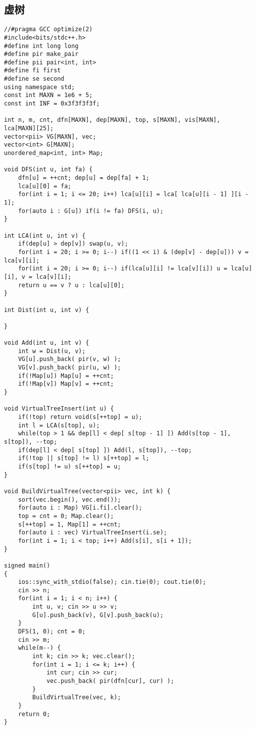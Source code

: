 \subsection{虚树}
\begin{lstlisting}
//#pragma GCC optimize(2)
#include<bits/stdc++.h>
#define int long long
#define pir make_pair
#define pii pair<int, int>
#define fi first
#define se second
using namespace std;
const int MAXN = 1e6 + 5;
const int INF = 0x3f3f3f3f;

int n, m, cnt, dfn[MAXN], dep[MAXN], top, s[MAXN], vis[MAXN], lca[MAXN][25];
vector<pii> VG[MAXN], vec;
vector<int> G[MAXN];
unordered_map<int, int> Map;

void DFS(int u, int fa) {
	dfn[u] = ++cnt; dep[u] = dep[fa] + 1;
	lca[u][0] = fa;
	for(int i = 1; i <= 20; i++) lca[u][i] = lca[ lca[u][i - 1] ][i - 1];
	for(auto i : G[u]) if(i != fa) DFS(i, u);
}

int LCA(int u, int v) {
	if(dep[u] > dep[v]) swap(u, v);
	for(int i = 20; i >= 0; i--) if((1 << i) & (dep[v] - dep[u])) v = lca[v][i];
	for(int i = 20; i >= 0; i--) if(lca[u][i] != lca[v][i]) u = lca[u][i], v = lca[v][i];
	return u == v ? u : lca[u][0];
}

int Dist(int u, int v) {

}

void Add(int u, int v) {
	int w = Dist(u, v);
	VG[u].push_back( pir(v, w) );
	VG[v].push_back( pir(u, w) );
	if(!Map[u]) Map[u] = ++cnt;
	if(!Map[v]) Map[v] = ++cnt;
}

void VirtualTreeInsert(int u) {
	if(!top) return void(s[++top] = u);
	int l = LCA(s[top], u);
	while(top > 1 && dep[l] < dep[ s[top - 1] ]) Add(s[top - 1], s[top]), --top;
	if(dep[l] < dep[ s[top] ]) Add(l, s[top]), --top;
	if(!top || s[top] != l) s[++top] = l;
	if(s[top] != u) s[++top] = u;
}

void BuildVirtualTree(vector<pii> vec, int k) {
	sort(vec.begin(), vec.end());
	for(auto i : Map) VG[i.fi].clear();
	top = cnt = 0; Map.clear(); 
	s[++top] = 1, Map[1] = ++cnt;
	for(auto i : vec) VirtualTreeInsert(i.se);
	for(int i = 1; i < top; i++) Add(s[i], s[i + 1]);
}

signed main()
{
	ios::sync_with_stdio(false); cin.tie(0); cout.tie(0);
	cin >> n;
	for(int i = 1; i < n; i++) {
		int u, v; cin >> u >> v;
		G[u].push_back(v), G[v].push_back(u);
	}
	DFS(1, 0); cnt = 0;
	cin >> m;
	while(m--) {
		int k; cin >> k; vec.clear();
		for(int i = 1; i <= k; i++) {
			int cur; cin >> cur;
			vec.push_back( pir(dfn[cur], cur) );
		}
		BuildVirtualTree(vec, k);
	}
	return 0;
}
\end{lstlisting}

